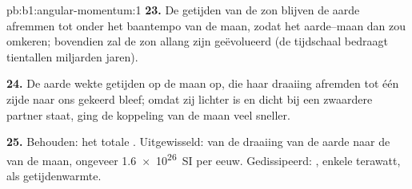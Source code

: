 \begin{solution}{pb:b1:angular-momentum:1}
\textbf{23.} De getijden van de zon blijven de aarde afremmen tot onder het
baantempo van de maan, zodat het  aarde--maan dan zou omkeren; bovendien
zal de zon allang zijn geëvolueerd (de tijdschaal bedraagt tientallen
miljarden jaren).

\textbf{24.} De aarde wekte getijden op de maan op, die haar draaiing afremden
tot één zijde naar ons gekeerd bleef; omdat zij lichter is en dicht bij een zwaardere
partner staat, ging de koppeling van de maan veel sneller.

\textbf{25.} Behouden: het totale . Uitgewisseld: 
van de draaiing van de aarde naar de  van de maan, ongeveer \qty{1.6e26}{SI}
per eeuw. Gedissipeerd: , enkele terawatt, als
getijdenwarmte.
\end{solution}

